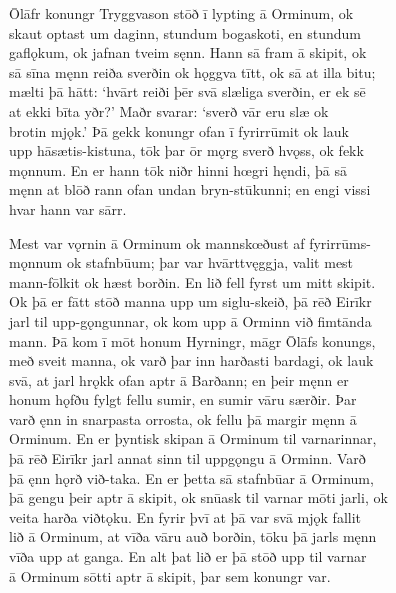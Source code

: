 \documentclass[12pt,letterpaper]{book}
\begin{document}
\begin{linenumbers}
Ōlāfr konungr Tryggvason stōð ī lypting ā Orminum, ok\\
skaut optast um daginn, stundum bogaskoti, en stundum\\
gaflǫkum, ok jafnan tveim sęnn.  Hann sā fram ā skipit, ok\\
sā sīna męnn reiða sverðin ok hǫggva tītt, ok sā at illa bitu;\\
mælti þā hātt: `hvārt reiði þēr svā slæliga sverðin, er ek sē\\
at ekki bīta yðr?'  Maðr svarar: `sverð vār eru slæ ok\\
brotin mjǫk.'  Þā gekk konungr ofan ī fyrirrūmit ok lauk\\
upp hāsætis-kistuna, tōk þar ōr mǫrg sverð hvǫss, ok fekk\\
mǫnnum.  En er hann tōk niðr hinni hœgri hęndi, þā sā\\
męnn at blōð rann ofan undan bryn-stūkunni; en engi vissi\\
hvar hann var sārr.

Mest var vǫrnin ā Orminum ok mannskœðust af fyrirrūms-\\
mǫnnum ok stafnbūum; þar var hvārttvęggja, valit mest\\
mann-fōlkit ok hæst borðin.  En lið fell fyrst um mitt skipit.\\
Ok þā er fātt stōð manna upp um siglu-skeið, þā rēð Eirīkr\\
jarl til upp-gǫngunnar, ok kom upp ā Orminn við fimtānda\\
mann.  Þā kom ī mōt honum Hyrningr, māgr Ōlāfs konungs,\\
með sveit manna, ok varð þar inn harðasti bardagi, ok lauk\\
svā, at jarl hrǫkk ofan aptr ā Barðann; en þeir męnn er\\
honum hǫfðu fylgt fellu sumir, en sumir vāru særðir.  Þar\\
varð ęnn in snarpasta orrosta, ok fellu þā margir męnn ā\\
Orminum.  En er þyntisk skipan ā Orminum til varnarinnar,\\
þā rēð Eirīkr jarl annat sinn til uppgǫngu ā Orminn.  Varð\\
þā ęnn hǫrð við-taka.  En er þetta sā stafnbūar ā Orminum,\\
þā gengu þeir aptr ā skipit, ok snūask til varnar mōti jarli, ok\\
veita harða viðtǫku.  En fyrir þvī at þā var svā mjǫk fallit\\
lið ā Orminum, at vīða vāru auð borðin, tōku þā jarls męnn\\
vīða upp at ganga.  En alt þat lið er þā stōð upp til varnar\\
ā Orminum sōtti aptr ā skipit, þar sem konungr var.


\end{linenumbers}
\end{document}
